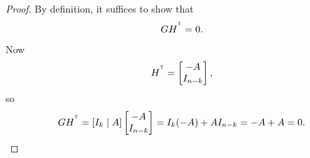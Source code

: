 \begin{proof}
	By definition, it suffices to show that
	\[
	GH^{^{\mathsf T}}=0.
	\]
	Now
	\[
	H^{^{\mathsf T}}=
	\begin{bmatrix}
		-A\\
		I_{n-k}
	\end{bmatrix},
	\]
	so
	\[
	GH^{^{\mathsf T}}
	=
	[I_k\mid A]
	\begin{bmatrix}
		-A\\
		I_{n-k}
	\end{bmatrix}
	=
	I_k(-A)+AI_{n-k}
	=
	-A+A
	=
	0.
	\]
%	
\end{proof}


